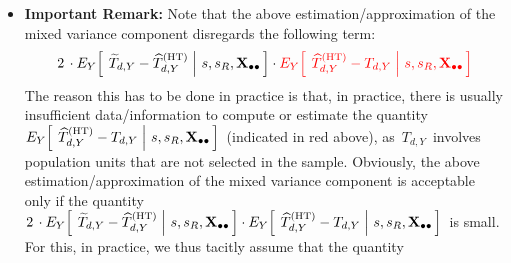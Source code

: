 \begin{itemize}
\begin{eqnarray*}
{            \;\right\vert\,
            s,s_{R},\Xobs
            \,\right]}
    \\
    & {\color{red}\approx} &
        2\cdot
        \Cov_{Y}\!\left(\,
            \left.
            \widetilde{T}_{d,Y} - \widehat{T}^{\textnormal{(HT)}}_{d,Y}
            \,,\,
            \widehat{T}^{\textnormal{(HT)}}_{d,Y} - T_{d,Y}
            \;\right\vert\,
            s,s_{R},\Xobs
            \,\right)
    \\
    & = &
        {\color{blue}
        2\,\cdot\!\left(\;
            \underset{l \in s_{R}}{\sum}\,
                W^{(+)}_{d,l}\,(w_{l}-1)\,d_{l}\,\sigma_{l}^{2}
            \;\,-\;
            \underset{k \in s_{M}}{\sum}\,
                w_{k}\,(w_{1}-1)\,d_{k}^{2}\,\sigma_{k}^{2}
            \,\right)
        }
    \end{eqnarray*}
\item
    \textbf{Important Remark:}
    \vskip 0.05cm
    \noindent
    Note that the above estimation/approximation of the mixed variance component
    disregards the following term:
    \begin{equation*}
    2\,\cdot E_{Y}\!\left[\;
        \left.
        \widetilde{T}_{d,Y} - \widehat{T}^{\textnormal{(HT)}}_{d,Y}
        \;\right\vert\,
        s,s_{R},\mathbf{X}_{\bullet\bullet}
        \,\right]
    \cdot
    {\color{red}E_{Y}\!\left[\;
        \left.
        \widehat{T}^{\textnormal{(HT)}}_{d,Y} - T_{d,Y}
        \;\right\vert\,
        s,s_{R},\mathbf{X}_{\bullet\bullet}\,\right]}
    \end{equation*}
    The reason this has to be done in practice is that, in practice,
    there is usually insufficient data/information to compute or estimate
    the quantity
    \,$
    E_{Y}\!\left[\;
        \left.
        \widehat{T}^{\textnormal{(HT)}}_{d,Y} - T_{d,Y}
        \;\right\vert\,
        s,s_{R},\mathbf{X}_{\bullet\bullet}
        \,\right]
    $\,
    (indicated in red above), as \,$T_{d,Y}$\, involves population units
    that are not selected in the sample.
    \vskip 0.1cm
    \noindent
    Obviously, the above estimation/approximation of the mixed variance component
    is acceptable only if the quantity
    \,$
    2\,\cdot E_{Y}\!\left[\;
        \left.
        \widetilde{T}_{d,Y} - \widehat{T}^{\textnormal{(HT)}}_{d,Y}
        \;\right\vert\,
        s,s_{R},\mathbf{X}_{\bullet\bullet}
        \,\right]
    \cdot
    {\color{black}E_{Y}\!\left[\;
        \left.
        \widehat{T}^{\textnormal{(HT)}}_{d,Y} - T_{d,Y}
        \;\right\vert\,
        s,s_{R},\mathbf{X}_{\bullet\bullet}\,\right]}
    $\,
    is small.
    \vskip 0.1cm
    \noindent
    For this, in practice, we thus {\color{red}tacitly assume} that the quantity

\end{itemize}
